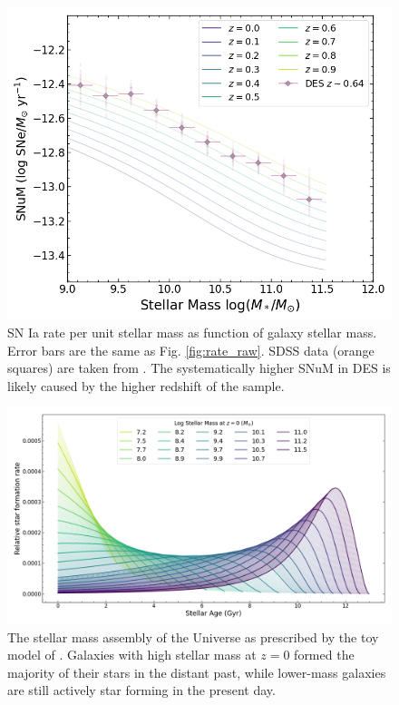\documentclass[fleqn,usenatbib]{mnras}
\begin{document}
\begin{figure}
    \centering
    \includegraphics[width=.5\textwidth]{figs/SNuM.png}
    \caption{SN Ia rate per unit stellar mass as function of galaxy stellar mass. Error bars are the same as Fig. \ref{fig:rate_raw}. SDSS data (orange squares) are taken from \citet{Graur2013}. The systematically higher SNuM in DES is likely caused by the higher redshift of the sample. }%
    \label{fig:snum}
\end{figure}


\begin{figure}
    \centering
    \includegraphics[width=\textwidth]{figs/SFHs_colour.png}
    \caption{The stellar mass assembly of the Universe as prescribed by the toy model of \citet{Childress2014}. Galaxies with high stellar mass at $z=0$ formed the majority of their stars in the distant past, while lower-mass galaxies are still actively star forming in the present day.}
    \label{fig:SFHs}
\end{figure}
\end{document}
